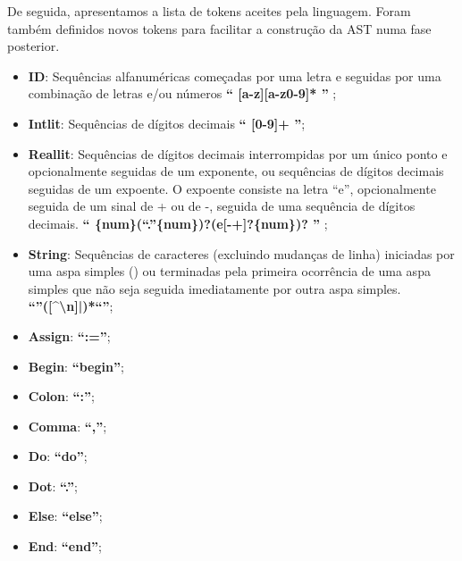 \documentclass[12pt]{article}
\begin{document}
\indent De seguida, apresentamos a lista de tokens aceites pela linguagem. Foram também definidos novos tokens para facilitar a construção da AST numa fase posterior.\\

\begin{itemize}

\item \textbf{ID}: Sequências alfanuméricas começadas por uma letra e seguidas por uma combinação de letras e/ou números \textbf{ `` [a-z][a-z0-9]* '' };

\item \textbf{Intlit}: Sequências de dígitos decimais \textbf{ `` [0-9]+ ''};

\item \textbf{Reallit}: Sequências de dígitos decimais interrompidas por um único ponto e opcionalmente seguidas de um exponente, ou sequências de dígitos decimais seguidas de um expoente. O expoente consiste na letra ``e'', opcionalmente seguida de um sinal de + ou de -, seguida de uma sequência de dígitos decimais. \textbf{ `` \{num\}(``.''\{num\})?(e[-+]?\{num\})? '' };

\item \textbf{String}: Sequências de caracteres (excluindo mudanças de linha) iniciadas por uma aspa simples (\textquotesingle) ou terminadas pela primeira ocorrência de uma aspa simples que não seja seguida imediatamente por outra aspa simples. \textbf{\textquotedblleft \textquotesingle \textquotedblright([\^  \space \textbackslash n\textquotesingle]|\textquotesingle\textquotesingle)*\textquotedblleft\textquotesingle\textquotedblright};

\item \textbf{Assign}: \textbf{``:=''};

\item \textbf{Begin}: \textbf{``begin''};

\item \textbf{Colon}: \textbf{``:''};

\item \textbf{Comma}: \textbf{``,''};

\item \textbf{Do}: \textbf{``do''};

\item \textbf{Dot}: \textbf{``.''};

\item \textbf{Else}: \textbf{``else''};

\item \textbf{End}: \textbf{``end''};


\end{itemize}
\end{document}
